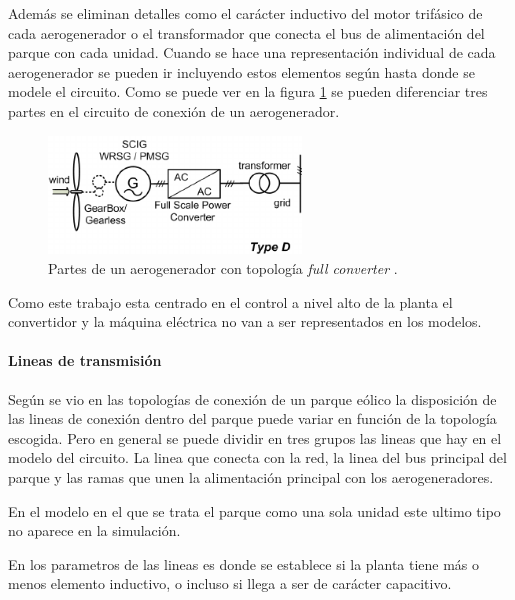 \documentclass{book}
\begin{document}
Adem\'as se eliminan detalles como el car\'acter inductivo del motor trif\'asico de cada aerogenerador o el transformador que conecta el bus de alimentaci\'on del parque con cada unidad. Cuando se hace una representaci\'on individual de cada aerogenerador se pueden ir incluyendo estos elementos seg\'un hasta donde se modele el circuito. Como se puede ver en la figura \ref{FullConverter} se pueden diferenciar tres partes en el circuito de conexi\'on de un aerogenerador. 

\begin{figure}[h!]
\centering
\includegraphics[width=0.6\textwidth]{FullConverter.PNG}
\caption{Partes de un aerogenerador con topolog\'ia \emph{full converter} \cite{FullConFig}. }
\label{FullConverter}
\end{figure} \par

Como este trabajo esta centrado en el control a nivel alto de la planta el convertidor y la m\'aquina el\'ectrica no van a ser representados en los modelos. \par
		
		\paragraph{Lineas de transmisi\'on}

Seg\'un se vio en las topolog\'ias de conexi\'on de un parque e\'olico la disposici\'on de las lineas de conexi\'on dentro del parque puede variar en funci\'on de la topolog\'ia escogida. Pero en general se puede dividir en tres grupos las lineas que hay en el modelo del circuito. La linea que conecta con la red, la linea del bus principal del parque y las ramas que unen la alimentaci\'on principal con los aerogeneradores. \par

En el modelo en el que se trata el parque como una sola unidad este ultimo tipo no aparece en la simulaci\'on. \par

En los parametros de las lineas es donde se establece si la planta tiene más o menos elemento inductivo, o incluso si llega a ser de car\'acter capacitivo. \par
\end{document}

